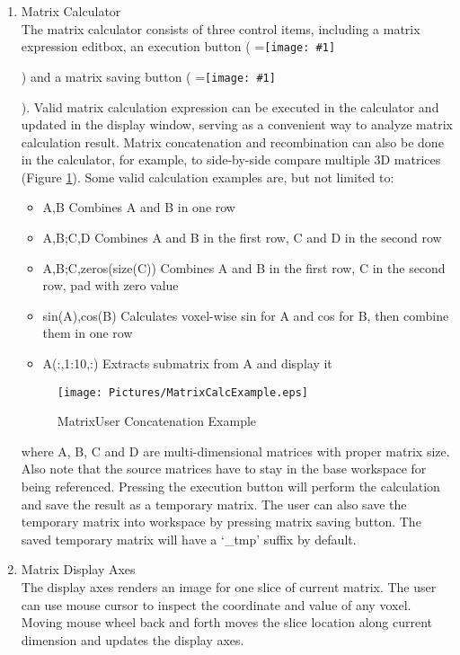 \documentclass{book}%
\newcommand{\vcenteredinclude}[1]{
\begingroup
\setbox0=\hbox{\texttt{[image: \#1]}}
\parbox{\wd0}{\box0}\endgroup}
\begin{document}
\begin{enumerate}
	\item Matrix Calculator \\
	
The matrix calculator consists of three control items, including a matrix expression editbox, an execution button (\vcenteredinclude{Pictures/MatrixCalc.eps}) and a matrix saving button (\vcenteredinclude{Pictures/Upload.eps}). Valid matrix calculation expression can be executed in the calculator and updated in the display window, serving as a convenient way to analyze matrix calculation result. Matrix concatenation and recombination can also be done in the calculator, for example, to side-by-side compare multiple 3D matrices (Figure \ref{fig:MatrixCalcExample}). Some valid calculation examples are, but not limited to:
	\begin{itemize}
		\item A,B Combines A and B in one row
		\item A,B;C,D Combines A and B in the first row, C and D in the second row
		\item A,B;C,zeros(size(C)) Combines A and B in the first row, C in the second row, pad with zero value
		\item sin(A),cos(B) Calculates voxel-wise sin for A and cos for B, then combine them in one row
		\item A(:,1:10,:) Extracts submatrix from A and display it
	\end{itemize}
	
\begin{figure}[htbp]
	\centering
		\texttt{[image: Pictures/MatrixCalcExample.eps]}
	\caption{MatrixUser Concatenation Example}
	\label{fig:MatrixCalcExample}
\end{figure}
	
where A, B, C and D are multi-dimensional matrices with proper matrix size. Also note that the source matrices have to stay in the base workspace for being referenced. Pressing the execution button will perform the calculation and save the result as a temporary matrix. The user can also save the temporary matrix into workspace by pressing matrix saving button. The saved temporary matrix will have a `\_tmp' suffix by default.
	
	\item Matrix Display Axes \\
	
The display axes renders an image for one slice of current matrix. The user can use mouse cursor to inspect the coordinate and value of any voxel. Moving mouse wheel back and forth moves the slice location along current dimension and updates the display axes.
	

\end{enumerate}
\end{document}
